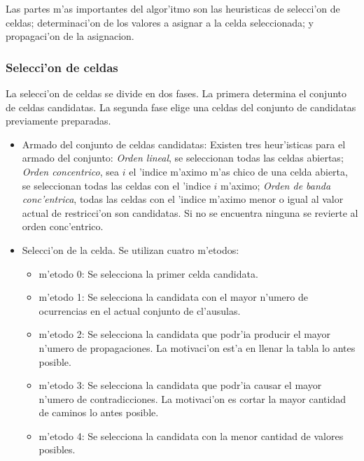 Las partes m'as importantes del algor'itmo son las heuristicas de selecci'on de celdas; determinaci'on de los valores a asignar a la celda seleccionada; y propagaci'on de la asignacion.

\subsubsection{Selecci'on de celdas}

La selecci'on de celdas se divide en dos fases. La primera determina el conjunto de celdas candidatas. La segunda fase elige una celdas del conjunto de candidatas previamente preparadas.

\begin{itemize}

\item{Armado del conjunto de celdas candidatas}: Existen tres heur'isticas para el armado del conjunto: \textit{Orden lineal}, se seleccionan todas las celdas abiertas; \textit{Orden concentrico}, sea $i$ el 'indice m'aximo m'as chico  de una celda abierta, se seleccionan todas las celdas con el 'indice $i$ m'aximo; \textit{Orden de banda conc'entrica}, todas las celdas con el 'indice m'aximo menor o igual al valor actual de restricci'on son candidatas. Si no se encuentra ninguna se revierte al orden conc'entrico.

\item{Selecci'on de la celda}. Se utilizan cuatro m'etodos:

\begin{itemize}
\item{m'etodo 0}: Se selecciona la primer celda candidata.
\item{m'etodo 1}: Se selecciona la candidata con el mayor n'umero de ocurrencias en el actual conjunto de cl'ausulas.
\item{m'etodo 2}: Se selecciona la candidata que podr'ia producir el mayor n'umero de propagaciones. La motivaci'on est'a en llenar la tabla lo antes posible.
\item{m'etodo 3}: Se selecciona la candidata que podr'ia causar el mayor n'umero de contradicciones. La motivaci'on es cortar la mayor cantidad de caminos lo antes posible.
\item{m'etodo 4}: Se selecciona la candidata con la menor cantidad de valores posibles.
\end{itemize}

\end{itemize}


